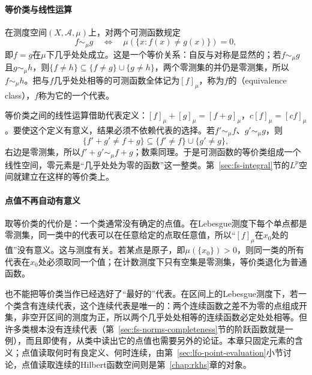 \paragraph{等价类与线性运算}
在测度空间$(X,\mathcal A,\mu)$上，对两个可测函数规定
\[
 f\sim_\mu g\quad\Longleftrightarrow\quad \mu(\{x:f(x)\neq g(x)\})=0,
\]
即$f=g$在$\mu$下几乎处处成立。这是一个等价关系：自反与对称是显然的；若$f\sim_\mu g$且$g\sim_\mu h$，则$\{f\neq h\}\subseteq\{f\neq g\}\cup\{g\neq h\}$，两个零测集的并仍是零测集，所以$f\sim_\mu h$。把与$f$几乎处处相等的可测函数全体记为$[f]_\mu$，称为$f$的（equivalence class），$f$称为它的一个代表。

等价类之间的线性运算借助代表定义：$[f]_\mu+[g]_\mu=[f+g]_\mu$，$c[f]_\mu=[cf]_\mu$。要使这个定义有意义，结果必须不依赖代表的选择。若$f'\sim_\mu f$、$g'\sim_\mu g$，则
\[
 \{f'+g'\neq f+g\}\subseteq\{f'\neq f\}\cup\{g'\neq g\},
\]
右边是零测集，所以$f'+g'\sim_\mu f+g$；数乘同理。于是可测函数的等价类组成一个线性空间，零元素是“几乎处处为零的函数”这一整类。第~\ref{sec:fs-integral}节的$L^p$空间就建立在这样的等价类上。

\paragraph{点值不再自动有意义}
取等价类的代价是：一个类通常没有确定的点值。在Lebesgue测度下每个单点都是零测集，同一类中的代表可以在任意给定的点取任意值，所以“$[f]_\mu$在$x_0$处的值”没有意义。这与测度有关。若某点是原子，即$\mu(\{x_0\})>0$，则同一类的所有代表在$x_0$处必须取同一个值；在计数测度下只有空集是零测集，等价类退化为普通函数。

也不能把等价类当作已经选好了“最好的”代表。在区间上的Lebesgue测度下，若一个类含有连续代表，这个连续代表是唯一的：两个连续函数之差不为零的点组成开集，非空开区间的测度为正，所以两个几乎处处相等的连续函数必定处处相等。但许多类根本没有连续代表（第~\ref{sec:fs-norms-completeness}节的阶跃函数就是一例），而且即使有，从类中读出它的点值也需要另外的论证。本章只固定元素的含义；点值读取何时有良定义、何时连续，由第~\ref{sec:lfo-point-evaluation}小节讨论，点值读取连续的Hilbert函数空间则是第~\ref{chap:rkhs}章的对象。
